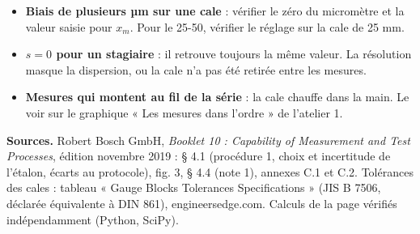 \documentclass[10pt,a4paper]{article}
\begin{document}
\begin{itemize}
\item \textbf{Biais de plusieurs µm sur une cale} : vérifier le zéro du micromètre et la valeur saisie pour $x_m$. Pour le 25-50, vérifier le réglage sur la cale de 25 mm.
\item \textbf{$s = 0$ pour un stagiaire} : il retrouve toujours la même valeur. La résolution masque la dispersion, ou la cale n'a pas été retirée entre les mesures.
\item \textbf{Mesures qui montent au fil de la série} : la cale chauffe dans la main. Le voir sur le graphique « Les mesures dans l'ordre » de l'atelier 1.
\end{itemize}

\vfill
{\footnotesize\color{uimm}\textbf{Sources.} Robert Bosch GmbH, \emph{Booklet 10 : Capability of Measurement and Test Processes}, édition novembre 2019 : § 4.1 (procédure 1, choix et incertitude de l'étalon, écarts au protocole), fig. 3, § 4.4 (note 1), annexes C.1 et C.2. Tolérances des cales : tableau « Gauge Blocks Tolerances Specifications » (JIS B 7506, déclarée équivalente à DIN 861), engineersedge.com. Calculs de la page vérifiés indépendamment (Python, SciPy).}
\end{document}
